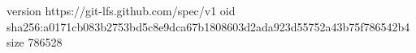 version https://git-lfs.github.com/spec/v1
oid sha256:a0171cb083b2753bd5c8e9dca67b1808603d2ada923d55752a43b75f786542b4
size 786528
